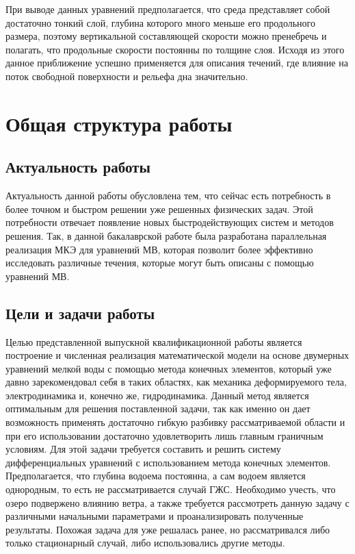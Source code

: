 \documentclass[14pt]{extreport}
\begin{document}
При выводе данных уравнений предполагается, что среда представляет собой достаточно тонкий слой, глубина которого много меньше его продольного размера, поэтому вертикальной составляющей скорости можно пренебречь и полагать, что продольные скорости постоянны по толщине слоя.  Исходя из этого данное приближение успешно применяется для описания течений, где влияние на поток свободной поверхности и рельефа дна значительно.

\chapter{Общая структура работы}
\section{Актуальность работы}
Актуальность данной работы обусловлена тем, что сейчас есть потребность в более точном и быстром решении уже решенных физических задач. Этой потребности отвечает появление новых быстродействующих систем и методов решения. Так, в данной бакалаврской работе была разработана параллельная реализация МКЭ для уравнений МВ, которая позволит более эффективно исследовать различные течения, которые могут быть описаны с помощью уравнений МВ.

\section{Цели и задачи работы}
Целью представленной выпускной квалификационной работы является построение и численная реализация математической модели на основе двумерных уравнений мелкой воды с помощью метода конечных элементов, который уже давно зарекомендовал\cite{bib:fem:nory} себя в таких областях, как механика деформируемого тела, электродинамика и, конечно же, гидродинамика. Данный метод является оптимальным для решения поставленной задачи, так как именно он дает возможность применять достаточно гибкую разбивку рассматриваемой области и при его использовании достаточно удовлетворить лишь главным граничным условиям. Для этой задачи требуется составить и решить систему дифференциальных уравнений с использованием метода конечных элементов. Предполагается, что глубина водоема постоянна, а сам водоем является однородным, то есть не рассматривается случай ГЖС. Необходимо учесть, что озеро подвержено влиянию ветра, а также требуется рассмотреть данную задачу с различными начальными параметрами и проанализировать полученные результаты. Похожая задача для уже решалась ранее, но рассматривался либо только стационарный случай\cite{bib:pankratov:2014:RTMV}, либо использовались другие методы\cite{bib:pankratov:2016:ANYMV}.
\end{document}

